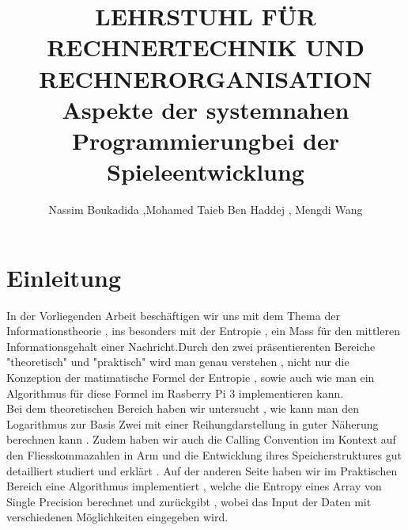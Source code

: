 \documentclass[11pt]{article}
\title{{\small LEHRSTUHL F\"UR RECHNERTECHNIK UND RECHNERORGANISATION}\\Aspekte der systemnahen Programmierungbei der Spieleentwicklung}
\author{Nassim Boukadida ,Mohamed Taieb Ben Haddej , Mengdi Wang}
\begin{document}
\maketitle

\tableofcontents
\newpage
\section{Einleitung} 





In der Vorliegenden Arbeit besch\"aftigen wir  uns mit dem Thema der Informationstheorie , ins besonders mit der Entropie , ein Mass f\"ur den mittleren Informationsgehalt einer Nachricht.Durch den zwei pr\"asentierenten Bereiche "theoretisch" und "praktisch" wird man genau verstehen , nicht nur die Konzeption der matimatische Formel der Entropie , sowie auch wie man ein Algorithmus f\"ur diese Formel im Rasberry Pi 3 implementieren kann. \\
Bei dem theoretischen Bereich haben wir untersucht , wie kann man den Logarithmus zur Basis Zwei mit einer Reihungdarstellung  in guter N\"aherung berechnen kann . Zudem haben wir auch die Calling Convention im Kontext auf den Fliesskommazahlen in Arm und die Entwicklung ihres Speicherstruktures  gut detailliert studiert und erkl\"art . Auf der anderen Seite haben wir im Praktischen Bereich eine Algorithmus  implementiert , welche die Entropy eines Array von Single Precision berechnet und zur\"uckgibt , wobei das Input der Daten mit verschiedenen M\"oglichkeiten eingegeben wird. \\  
\end{document}
